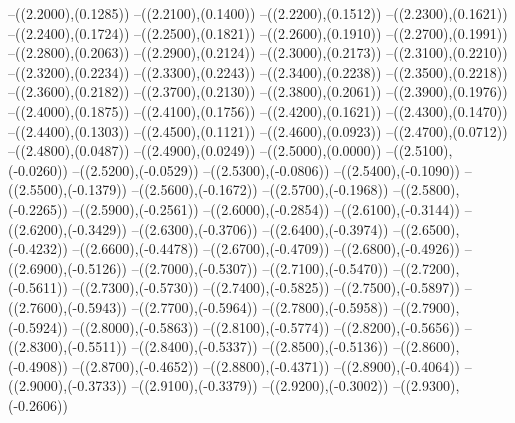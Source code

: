 {	--({\sx*(2.2000)},{\sy*(0.1285)})
	--({\sx*(2.2100)},{\sy*(0.1400)})
	--({\sx*(2.2200)},{\sy*(0.1512)})
	--({\sx*(2.2300)},{\sy*(0.1621)})
	--({\sx*(2.2400)},{\sy*(0.1724)})
	--({\sx*(2.2500)},{\sy*(0.1821)})
	--({\sx*(2.2600)},{\sy*(0.1910)})
	--({\sx*(2.2700)},{\sy*(0.1991)})
	--({\sx*(2.2800)},{\sy*(0.2063)})
	--({\sx*(2.2900)},{\sy*(0.2124)})
	--({\sx*(2.3000)},{\sy*(0.2173)})
	--({\sx*(2.3100)},{\sy*(0.2210)})
	--({\sx*(2.3200)},{\sy*(0.2234)})
	--({\sx*(2.3300)},{\sy*(0.2243)})
	--({\sx*(2.3400)},{\sy*(0.2238)})
	--({\sx*(2.3500)},{\sy*(0.2218)})
	--({\sx*(2.3600)},{\sy*(0.2182)})
	--({\sx*(2.3700)},{\sy*(0.2130)})
	--({\sx*(2.3800)},{\sy*(0.2061)})
	--({\sx*(2.3900)},{\sy*(0.1976)})
	--({\sx*(2.4000)},{\sy*(0.1875)})
	--({\sx*(2.4100)},{\sy*(0.1756)})
	--({\sx*(2.4200)},{\sy*(0.1621)})
	--({\sx*(2.4300)},{\sy*(0.1470)})
	--({\sx*(2.4400)},{\sy*(0.1303)})
	--({\sx*(2.4500)},{\sy*(0.1121)})
	--({\sx*(2.4600)},{\sy*(0.0923)})
	--({\sx*(2.4700)},{\sy*(0.0712)})
	--({\sx*(2.4800)},{\sy*(0.0487)})
	--({\sx*(2.4900)},{\sy*(0.0249)})
	--({\sx*(2.5000)},{\sy*(0.0000)})
	--({\sx*(2.5100)},{\sy*(-0.0260)})
	--({\sx*(2.5200)},{\sy*(-0.0529)})
	--({\sx*(2.5300)},{\sy*(-0.0806)})
	--({\sx*(2.5400)},{\sy*(-0.1090)})
	--({\sx*(2.5500)},{\sy*(-0.1379)})
	--({\sx*(2.5600)},{\sy*(-0.1672)})
	--({\sx*(2.5700)},{\sy*(-0.1968)})
	--({\sx*(2.5800)},{\sy*(-0.2265)})
	--({\sx*(2.5900)},{\sy*(-0.2561)})
	--({\sx*(2.6000)},{\sy*(-0.2854)})
	--({\sx*(2.6100)},{\sy*(-0.3144)})
	--({\sx*(2.6200)},{\sy*(-0.3429)})
	--({\sx*(2.6300)},{\sy*(-0.3706)})
	--({\sx*(2.6400)},{\sy*(-0.3974)})
	--({\sx*(2.6500)},{\sy*(-0.4232)})
	--({\sx*(2.6600)},{\sy*(-0.4478)})
	--({\sx*(2.6700)},{\sy*(-0.4709)})
	--({\sx*(2.6800)},{\sy*(-0.4926)})
	--({\sx*(2.6900)},{\sy*(-0.5126)})
	--({\sx*(2.7000)},{\sy*(-0.5307)})
	--({\sx*(2.7100)},{\sy*(-0.5470)})
	--({\sx*(2.7200)},{\sy*(-0.5611)})
	--({\sx*(2.7300)},{\sy*(-0.5730)})
	--({\sx*(2.7400)},{\sy*(-0.5825)})
	--({\sx*(2.7500)},{\sy*(-0.5897)})
	--({\sx*(2.7600)},{\sy*(-0.5943)})
	--({\sx*(2.7700)},{\sy*(-0.5964)})
	--({\sx*(2.7800)},{\sy*(-0.5958)})
	--({\sx*(2.7900)},{\sy*(-0.5924)})
	--({\sx*(2.8000)},{\sy*(-0.5863)})
	--({\sx*(2.8100)},{\sy*(-0.5774)})
	--({\sx*(2.8200)},{\sy*(-0.5656)})
	--({\sx*(2.8300)},{\sy*(-0.5511)})
	--({\sx*(2.8400)},{\sy*(-0.5337)})
	--({\sx*(2.8500)},{\sy*(-0.5136)})
	--({\sx*(2.8600)},{\sy*(-0.4908)})
	--({\sx*(2.8700)},{\sy*(-0.4652)})
	--({\sx*(2.8800)},{\sy*(-0.4371)})
	--({\sx*(2.8900)},{\sy*(-0.4064)})
	--({\sx*(2.9000)},{\sy*(-0.3733)})
	--({\sx*(2.9100)},{\sy*(-0.3379)})
	--({\sx*(2.9200)},{\sy*(-0.3002)})
	--({\sx*(2.9300)},{\sy*(-0.2606)})
}
